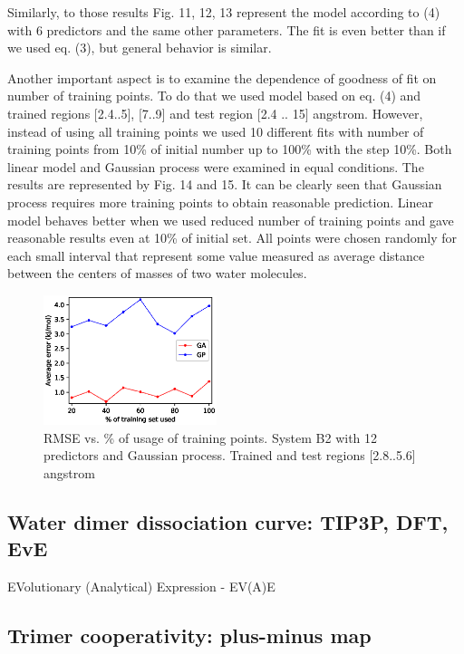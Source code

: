 \documentclass[aps,prl,reprint,amsmath,amssymb,nature]{revtex4-1}
\begin{document}
Similarly, to those results Fig. 11, 12, 13 represent the model 
according to (4) with 6 predictors and the same other parameters. The 
fit is even better than if we used eq. (3), but general behavior is 
similar.




Another important aspect is to examine the dependence of goodness of fit 
on number of training points. To do that we used model based on eq. (4) 
and trained regions $[$2.4..5$]$, $[$7..9$]$ and test region $[$2.4 .. 
15$]$ angstrom. However, instead of using all training points we used 10 
different fits with number of training points from 10\% of initial 
number up to 100\% with the step 10\%. Both linear model and Gaussian 
process were examined in equal conditions. The results are represented 
by Fig. 14 and 15. It can be clearly seen that Gaussian process requires 
more training points to obtain reasonable prediction. Linear model 
behaves better when we used reduced number of training points and gave 
reasonable results even at 10\% of initial set. All points were chosen 
randomly for each small interval that represent some value measured as 
average distance between the centers of masses of two water molecules. 

\begin{figure}[h]
\centering
\includegraphics[width=0.45\textwidth]{media/B2_12_predictors_RMSE_vs_percentage_of_training_set_used.eps}
\caption{RMSE vs. \% of usage of training points. System B2 with 12 predictors and Gaussian process. Trained and test regions [2.8..5.6] angstrom}
\label{Fig:B2_fractions}
\end{figure}


\subsection{Water dimer dissociation curve: TIP3P, DFT, EvE}

EVolutionary (Analytical) Expression - EV(A)E

\subsection{Trimer cooperativity: plus-minus map}
\end{document}

